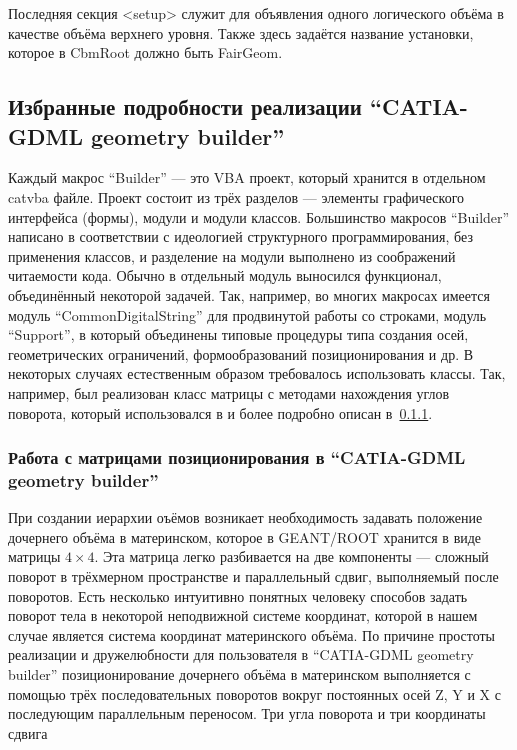 Последняя секция <setup> служит для объявления одного логического объёма в качестве объёма верхнего уровня. Также здесь задаётся название установки, которое в CbmRoot должно быть FairGeom.

\subsection{Избранные подробности реализации ``CATIA-GDML geometry builder''}\label{sec:BuilderImp}

Каждый макрос ``Builder'' --- это VBA проект, который хранится в отдельном catvba файле. Проект состоит из трёх разделов --- элементы графического интерфейса (формы), модули и модули классов. Большинство макросов ``Builder'' написано в соответствии с идеологией структурного программирования, без применения классов, и разделение на модули выполнено из соображений читаемости кода. Обычно в отдельный модуль выносился функционал, объединённый некоторой задачей. Так, например, во многих макросах имеется модуль ``CommonDigitalString'' для продвинутой работы со строками, модуль ``Support'', в который объединены типовые процедуры типа создания осей, геометрических ограничений, формообразований позиционирования и др. В некоторых случаях естественным образом требовалось использовать классы. Так, например, был реализован класс матрицы с методами нахождения углов поворота, который использовался в \todo и более подробно описан в~\ref{sec:Matrices}.

\subsubsection{Работа с матрицами позиционирования в ``CATIA-GDML geometry builder''}\label{sec:Matrices}

При создании иерархии оъёмов возникает необходимость задавать положение дочернего объёма в материнском, которое в GEANT/ROOT хранится в виде матрицы $4 \times 4$. Эта матрица легко разбивается на две компоненты --- сложный поворот в трёхмерном пространстве и параллельный сдвиг, выполняемый после поворотов. Есть несколько интуитивно понятных человеку способов задать поворот тела в некоторой неподвижной системе координат, которой в нашем случае является система координат материнского объёма. По причине простоты реализации и дружелюбности для пользователя в ``CATIA-GDML geometry builder'' позиционирование дочернего объёма в материнском выполняется с помощью трёх последовательных поворотов вокруг постоянных осей Z, Y и X с последующим параллельным переносом. Три угла поворота и три координаты сдвига

